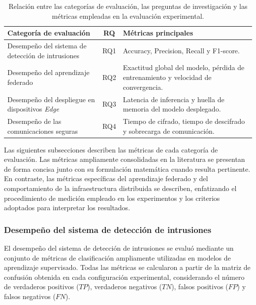\documentclass[journal,article,submit,moreauthors]{Definitions/mdpi}
\begin{document}
\begin{table}[ht]
\centering
\caption{Relación entre las categorías de evaluación, las preguntas de investigación y las métricas empleadas en la evaluación experimental.}
\label{tab:metrics_mapping}
\footnotesize

\begin{tabularx}{\columnwidth}{p{3.5cm} c X}
\toprule
\textbf{Categoría de evaluación} & \textbf{RQ} & \textbf{Métricas principales} \\
\midrule

Desempeño del sistema de detección de intrusiones &  RQ1 & Accuracy, Precision, Recall y F1-score. \\

Desempeño del aprendizaje federado & RQ2 & Exactitud global del modelo, pérdida de entrenamiento y velocidad de convergencia. \\

Desempeño del despliegue en dispositivos \textit{Edge} & RQ3 & Latencia de inferencia y huella de memoria del modelo desplegado. \\

Desempeño de las comunicaciones seguras & RQ4 & Tiempo de cifrado, tiempo de descifrado y sobrecarga de comunicación. \\

\bottomrule
\end{tabularx}
\end{table}

Las siguientes subsecciones describen las métricas de cada categoría de evaluación. Las métricas ampliamente consolidadas en la literatura se presentan de forma concisa junto con su formulación matemática cuando resulta pertinente. En contraste, las métricas específicas del aprendizaje federado y del comportamiento de la infraestructura distribuida se describen, enfatizando el procedimiento de medición empleado en los experimentos y los criterios adoptados para interpretar los resultados.

\subsubsection{Desempeño del sistema de detección de intrusiones}
El desempeño del sistema de detección de intrusiones se evaluó mediante un conjunto de métricas de clasificación ampliamente utilizadas en modelos de aprendizaje supervisado. Todas las métricas se calcularon a partir de la matriz de confusión obtenida en cada configuración experimental, considerando el número de verdaderos positivos ($TP$), verdaderos negativos ($TN$), falsos positivos ($FP$) y falsos negativos ($FN$).
\end{document}

